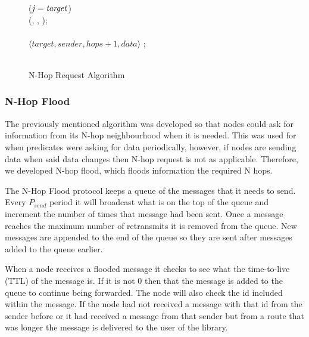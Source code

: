 \begin{figure}[H]
\begin{boxedminipage}{\linewidth}
    \null\qq\qq {} ($\mbox{\emph{j}} = \mbox{\emph{target}}$) \\
    \null\qq\qq\qq {}(, , );\\
    \null\qq\qq {}\\
    \null\qq\qq\qq {}$\langle target, sender, hops + 1, data \rangle$  ;\\
    \null\qq\qq {}\\
  \end{boxedminipage}
  \caption{N-Hop Request Algorithm}
  \label{fig:n-hop-req-algorithm}
\end{figure}

\subsubsection{N-Hop Flood}

The previously mentioned algorithm was developed so that nodes could ask for information from its N-hop neighbourhood when it is needed. This was used for when predicates were asking for data periodically, however, if nodes are sending data when said data changes then N-hop request is not as applicable. Therefore, we developed N-hop flood, which floods information the required N hops.

The N-Hop Flood protocol keeps a queue of the messages that it needs to send. Every $P_{send}$ period it will broadcast what is on the top of the queue and increment the number of times that message had been sent. Once a message reaches the maximum number of retransmits it is removed from the queue. New messages are appended to the end of the queue so they are sent after messages added to the queue earlier.

When a node receives a flooded message it checks to see what the time-to-live (TTL) of the message is. If it is not 0 then that  the message is added to the queue to continue being forwarded. The node will also check the id included within the message. If the node had not received a message with that id from the sender before or it had received a message from that sender but from a route that was longer the message is delivered to the user of the library.

